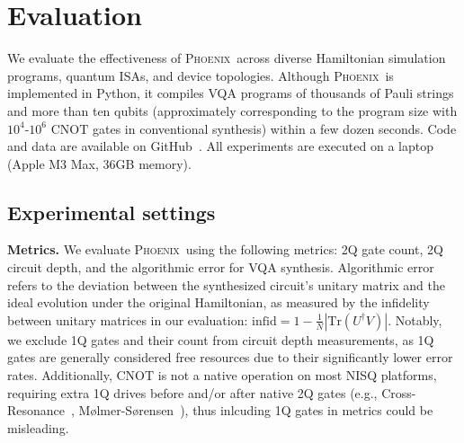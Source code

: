 \documentclass[conference,9pt]{IEEEtran}
\newcommand{\dquote}[1]{``#1''}
\newcommand{\phoenix}{\textsc{Phoenix}}
\newcommand{\CNOT}{\mathrm{CNOT}}
\begin{document}

\section{Evaluation}

We evaluate the effectiveness of \phoenix\ across diverse Hamiltonian simulation programs, quantum ISAs, and device topologies. Although \phoenix\ is implemented in Python, it compiles VQA programs of thousands of Pauli strings and more than ten qubits (approximately corresponding to the program size with $10^4$-$10^6$ $\CNOT$ gates in conventional synthesis) within a few dozen seconds. Code and data are available on GitHub~\cite{phoenixGitHub}. All experiments are executed on a laptop (Apple M3 Max, 36GB memory).

\subsection{Experimental settings}


    \begin{table}[tbp]
        \centering
        \caption{UCCSD benchmark suite.}
        \setlength{\tabcolsep}{4.2pt}
        \scalebox{0.85}{
            
        }
        \label{tab:uccsd}
        
    \end{table}
        
    
    \textbf{Metrics.} We evaluate \phoenix\ using the following metrics: 2Q gate count, 2Q circuit depth, and the algorithmic error for VQA synthesis. Algorithmic error refers to the deviation between the synthesized circuit's unitary matrix and the ideal evolution under the original Hamiltonian, as measured by the infidelity between unitary matrices in our evaluation: $\mathrm{infid} = 1 - \frac{1}{N}|\mathrm{Tr}(U^\dagger V)|$. Notably, we exclude 1Q gates and their count from circuit depth measurements, as 1Q gates are generally considered free resources due to their significantly lower error rates. Additionally, $\CNOT$ is not a native operation on most NISQ platforms, requiring extra 1Q drives before and/or after native 2Q gates (e.g., Cross-Resonance~\cite{rigetti2010fully}, Mølmer-Sørensen~\cite{bruzewicz2019trapped}), thus inlcuding 1Q gates in metrics could be misleading.  %
    
\end{document}

